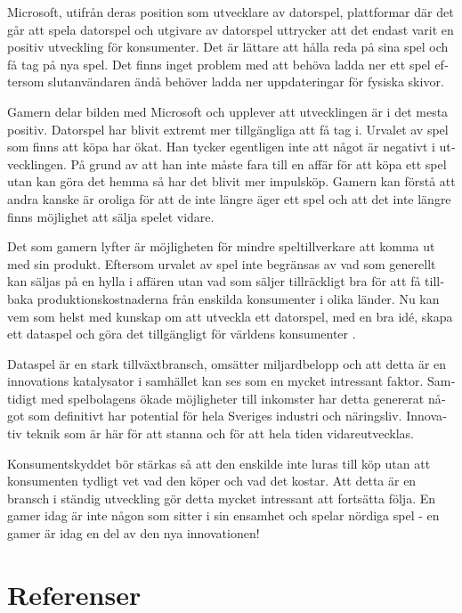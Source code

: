 \documentclass[11p]{article}
\begin{document}
\begin{otherlanguage}{swedish}
        Microsoft, utifrån deras position som utvecklare av datorspel, plattformar där det går att spela datorspel och utgivare av datorspel uttrycker att det endast varit en positiv utveckling för konsumenter.
        Det är lättare att hålla reda på sina spel och få tag på nya spel.
        Det finns inget problem med att behöva ladda ner ett spel eftersom slutanvändaren ändå behöver ladda ner uppdateringar för fysiska skivor.

        Gamern delar bilden med Microsoft och upplever att utvecklingen är i det mesta positiv.
        Datorspel har blivit extremt mer tillgängliga att få tag i.
        Urvalet av spel som finns att köpa har ökat.
        Han tycker egentligen inte att något är negativt i utvecklingen.
        På grund av att han inte måste fara till en affär för att köpa ett spel utan kan göra det hemma så har det blivit mer impulsköp.
        Gamern kan förstå att andra kanske är oroliga för att de inte längre äger ett spel och att det inte längre finns möjlighet att sälja spelet vidare.

        Det som gamern lyfter är möjligheten för mindre speltillverkare att komma ut med sin produkt.
        Eftersom urvalet av spel inte begränsas av vad som generellt kan säljas på en hylla i affären utan vad som säljer tillräckligt bra för att få tillbaka produktionskostnaderna från enskilda konsumenter i olika länder. Nu kan vem som helst med kunskap om att utveckla ett datorspel, med en bra idé, skapa ett dataspel och göra det tillgängligt för världens konsumenter .

        Dataspel är en stark tillväxtbransch, omsätter miljardbelopp och att detta är en innovations katalysator i samhället kan ses som en mycket intressant faktor.
        Samtidigt med spelbolagens ökade möjligheter till inkomster har detta genererat något som definitivt har potential för hela Sveriges industri och näringsliv.
        Innovativ teknik som är här för att stanna och för att hela tiden vidareutvecklas.

        Konsumentskyddet bör stärkas så att den enskilde inte luras till köp utan att konsumenten tydligt vet vad den köper och vad det kostar.
        Att detta är en bransch i ständig utveckling gör detta mycket intressant att fortsätta följa.
        En gamer idag är inte någon som sitter i sin ensamhet och spelar nördiga spel - en gamer är idag en del av den nya innovationen!


        \setlength{\leftskip}{0cm}

        \newpage
        \section{Referenser}
        \printbibliography[heading=none]


\end{otherlanguage}
\end{document}
